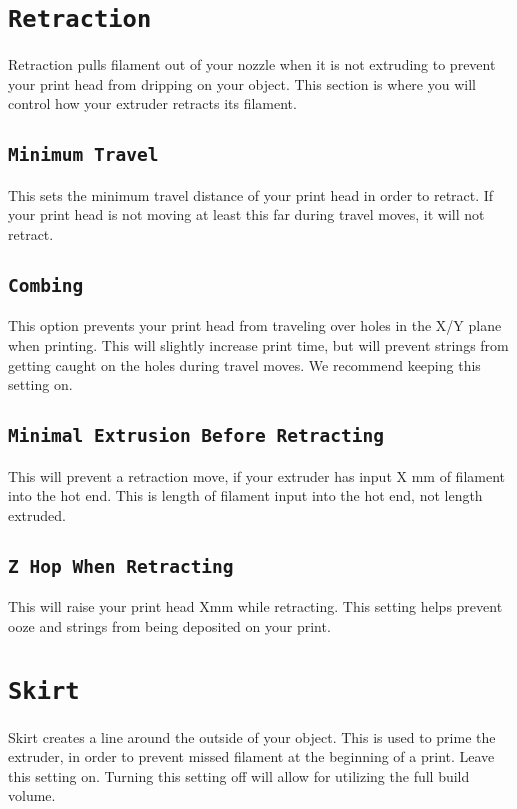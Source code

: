 \section{\texttt{Retraction}}
Retraction pulls filament out of your nozzle when it is not extruding to prevent your print head from dripping on your object. This section is where you will control how your extruder retracts its filament.

\subsection{\texttt{Minimum Travel}}
This sets the minimum travel distance of your print head in order to retract. If your print head is not moving at least this far during travel moves, it will not retract.

\subsection{\texttt{Combing}}
This option prevents your print head from traveling over holes in the X/Y plane when printing. This will slightly increase print time, but will prevent strings from getting caught on the holes during travel moves. We recommend keeping this setting on.

\subsection{\texttt{Minimal Extrusion Before Retracting}}
This will prevent a retraction move, if your extruder has input X mm of filament into the hot end. This is length of filament input into the hot end, not length extruded.

\subsection{\texttt{Z Hop When Retracting}}
This will raise your print head Xmm while retracting. This setting helps prevent ooze and strings from being deposited on your print. 

\section{\texttt{Skirt}}
Skirt creates a line around the outside of your object. This is used to prime the extruder, in order to prevent missed filament at the beginning of a print. Leave this setting on. Turning this setting off will allow for utilizing the full build volume.

